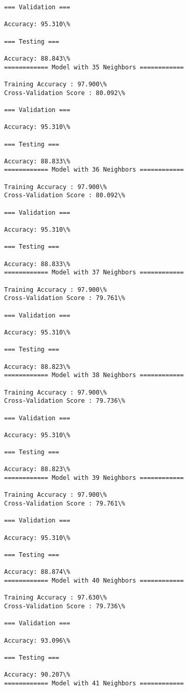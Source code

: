 \documentclass[11pt]{article}
\begin{document}
\begin{Verbatim}[commandchars=\\\{\}]
=== Validation ===

Accuracy: 95.310\%

=== Testing ===

Accuracy: 88.843\%
============ Model with 35 Neighbors ============

Training Accuracy : 97.900\%
Cross-Validation Score : 80.092\%

=== Validation ===

Accuracy: 95.310\%

=== Testing ===

Accuracy: 88.833\%
============ Model with 36 Neighbors ============

Training Accuracy : 97.900\%
Cross-Validation Score : 80.092\%

=== Validation ===

Accuracy: 95.310\%

=== Testing ===

Accuracy: 88.833\%
============ Model with 37 Neighbors ============

Training Accuracy : 97.900\%
Cross-Validation Score : 79.761\%

=== Validation ===

Accuracy: 95.310\%

=== Testing ===

Accuracy: 88.823\%
============ Model with 38 Neighbors ============

Training Accuracy : 97.900\%
Cross-Validation Score : 79.736\%

=== Validation ===

Accuracy: 95.310\%

=== Testing ===

Accuracy: 88.823\%
============ Model with 39 Neighbors ============

Training Accuracy : 97.900\%
Cross-Validation Score : 79.761\%

=== Validation ===

Accuracy: 95.310\%

=== Testing ===

Accuracy: 88.874\%
============ Model with 40 Neighbors ============

Training Accuracy : 97.630\%
Cross-Validation Score : 79.736\%

=== Validation ===

Accuracy: 93.096\%

=== Testing ===

Accuracy: 90.207\%
============ Model with 41 Neighbors ============


\end{Verbatim}
\end{document}

